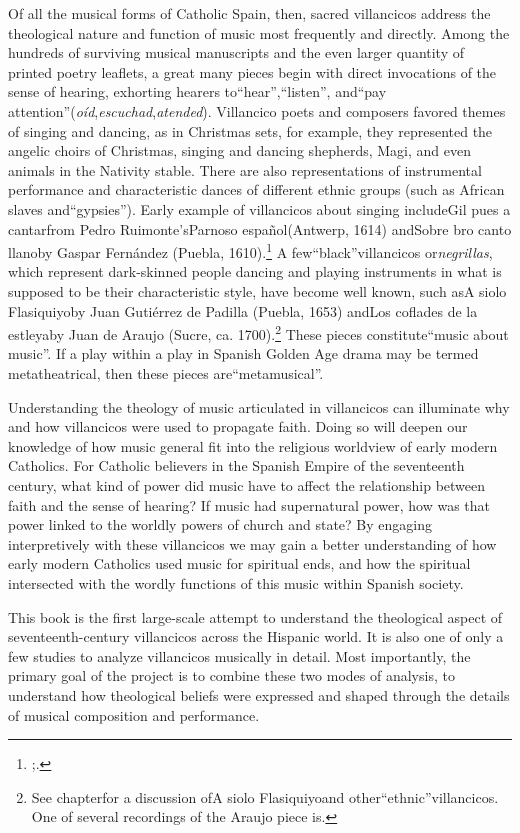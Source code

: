\documentclass{memoir}
\begin{document}
Of all the musical forms of Catholic Spain, then, sacred villancicos address the theological nature and function of music most frequently and directly. Among the hundreds of surviving musical manuscripts and the even larger quantity of printed poetry leaflets, a great many pieces begin with direct invocations of the sense of hearing, exhorting hearers to\enquote{hear},\enquote{listen}, and\enquote{pay attention}(\emph{oíd},\emph{escuchad},\emph{atended}). Villancico poets and composers favored themes of singing and dancing, as in Christmas sets, for example, they represented the angelic choirs of Christmas, singing and dancing shepherds, Magi, and even animals in the Nativity stable. There are also representations of instrumental performance and characteristic dances of different ethnic groups (such as African slaves and\enquote{gypsies}). Early example of villancicos about singing includeGil pues a cantarfrom Pedro Ruimonte’sParnoso español(Antwerp, 1614) andSobre bro canto llanoby Gaspar Fernández (Puebla, 1610).\footnote{;.}
A few\enquote{black}villancicos or\emph{negrillas}, which represent dark-skinned people dancing and playing instruments in what is supposed to be their characteristic style, have become well known, such asA siolo Flasiquiyoby Juan Gutiérrez de Padilla (Puebla, 1653) andLos coflades de la estleyaby Juan de Araujo (Sucre, ca. 1700).\footnote{See chapterfor a discussion ofA siolo Flasiquiyoand other\enquote{ethnic}villancicos. One of several recordings of the Araujo piece is.}
These pieces constitute\enquote{music about music}. If a play within a play in Spanish Golden Age drama may be termed metatheatrical, then these pieces are\enquote{metamusical}.

Understanding the theology of music articulated in villancicos can illuminate why and how villancicos were used to propagate faith. Doing so will deepen our knowledge of how music general fit into the religious worldview of early modern Catholics. For Catholic believers in the Spanish Empire of the seventeenth century, what kind of power did music have to affect the relationship between faith and the sense of hearing? If music had supernatural power, how was that power linked to the worldly powers of church and state? By engaging interpretively with these villancicos we may gain a better understanding of how early modern Catholics used music for spiritual ends, and how the spiritual intersected with the wordly functions of this music within Spanish society.

This book is the first large-scale attempt to understand the theological aspect of seventeenth-century villancicos across the Hispanic world. It is also one of only a few studies to analyze villancicos musically in detail. Most importantly, the primary goal of the project is to combine these two modes of analysis, to understand how theological beliefs were expressed and shaped through the details of musical composition and performance.
\end{document}
